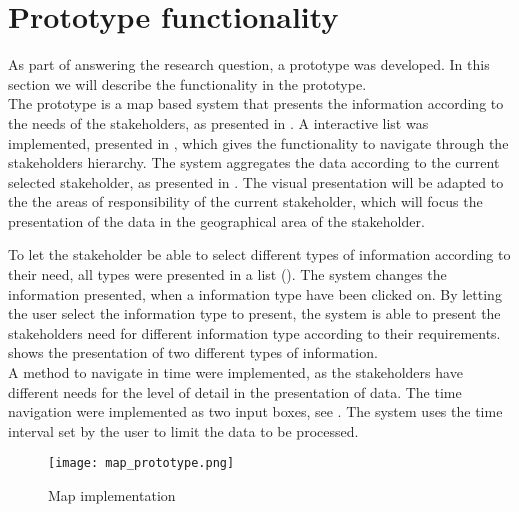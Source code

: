 
\section{Prototype functionality} %
\label{sec:prototype_functionality}
As part of answering the research question, a prototype was developed. In this
section we will describe the functionality in the prototype.\\

The prototype is a map based system that presents the information according to
the needs of the stakeholders, as presented in . A
interactive list was implemented, presented in ,
which gives the functionality to navigate through the stakeholders hierarchy.
The system aggregates the data according to the current selected stakeholder,
as presented in . The visual presentation will 
be adapted to the the areas of responsibility of the current stakeholder, 
which will focus the presentation of the data in the geographical area of the 
stakeholder.

To let the stakeholder be able to select different types of information
according to their need, all types were presented in a list ().
The system changes the information presented, when a information type have 
been clicked on.
By letting the user select the information type to present, the system is able
to present the stakeholders need for different information type according to
their requirements. 
shows the presentation of two different types of information.\\

A method to navigate in time were implemented, as the stakeholders have 
different needs for the level of detail in the presentation of data. The time
navigation were implemented as two input boxes, see .
The system uses the time interval set by the user to limit the data to be
processed. 

\begin{figure}[!htbp]
	\texttt{[image: map\_prototype.png]}
	\caption[Map implementation]{Map implementation}
	\label{fig:map_prototype}
\end{figure}

